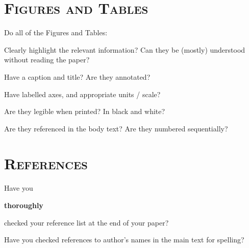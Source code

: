 \section*{\textsc{Figures and Tables}}
\vspace{0.5cm}
Do all of the Figures and Tables:
\begin{checklist}
	\item Clearly highlight the relevant information? Can they be (mostly) understood without reading the paper? 
	\item Have a caption and title? Are they annotated? 
	\item Have labelled axes, and appropriate units / scale?
	\item Are they legible when printed? In black and white?
	\item Are they referenced in the body text? Are they numbered sequentially?
\end{checklist}











\section*{\textsc{References}}
\vspace{0.5cm}

\begin{checklist}
	\item Have you \begin{em}\textbf{thoroughly}\end{em} checked your reference list at the end of your paper?
	\item Have you checked references to author's names in the main text for spelling?
\end{checklist}

